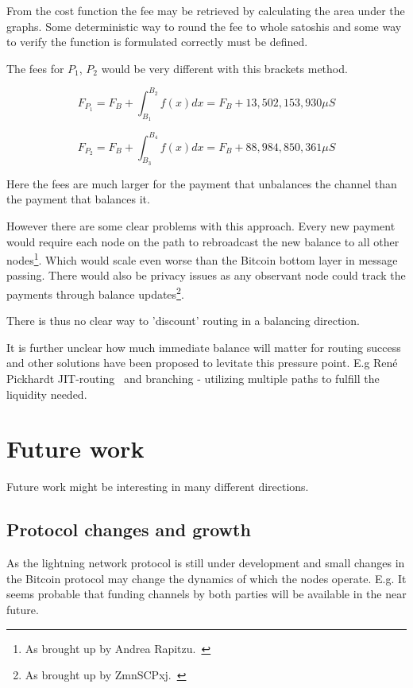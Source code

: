 From the cost function the fee may be retrieved by calculating the area under the graphs. Some deterministic way to round the fee to whole satoshis and some way to verify the function is formulated correctly must be defined. 

The fees for $P_1$, $P_2$ would be very different with this brackets method.

\[ F_{P_1} = F_{B} + \int_{B_1}^{B_2} f(x) dx = F_B + 13,502,153,930 \mu S \] 

\[ F_{P_2} = F_{B} + \int_{B_3}^{B_4} f(x) dx  = F_B + 88,984,850,361 \mu S \]

Here the fees are much larger for the payment that unbalances the channel than the payment that balances it. 

However there are some clear problems with this approach. Every new payment would require each \gls{node} on the path to rebroadcast the new balance to all other nodes\footnote{As brought up by Andrea Rapitzu.~\cite{raspitzu:fee}}. Which would scale even worse than the Bitcoin bottom layer in message passing. There would also be privacy issues as any observant node could track the payments through balance updates\footnote{As brought up by ZmnSCPxj.~\cite{ZmnSCPxj:fee}}.

There is thus no clear way to 'discount' routing in a balancing direction.

It is further unclear how much immediate balance will matter for routing success and other solutions have been proposed to levitate this pressure point. E.g René Pickhardt JIT-routing~\cite{pickard:jit} and branching - utilizing multiple paths to fulfill the liquidity needed.

\section{Future work}

Future work might be interesting in many different directions.

\subsection{Protocol changes and growth}

As the lightning network protocol is still under development and small changes in the Bitcoin protocol may change the dynamics of which the nodes operate. E.g. It seems probable that funding channels by both parties will be available in the near future. \\

